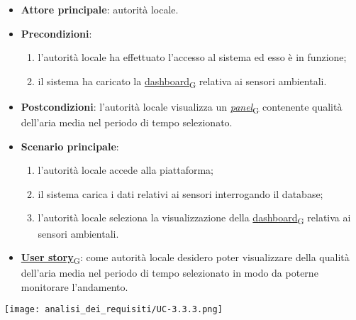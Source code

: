 \newpage
{}
\begin{itemize}
	\item \textbf{Attore principale}: autorità locale.
	\item \textbf{Precondizioni}:
	      \begin{enumerate}
		      \item l'autorità locale ha effettuato l'accesso al sistema ed esso è in funzione;
		      \item il sistema ha caricato la \href{https://7last.github.io/docs/pb/documentazione-interna/glossario\#dashboard}{dashboard\textsubscript{G}} relativa ai sensori ambientali.
	      \end{enumerate}
	\item \textbf{Postcondizioni}: l'autorità locale visualizza un \href{https://7last.github.io/docs/pb/documentazione-interna/glossario\#panel}{\textit{panel}\textsubscript{G}} contenente qualità dell'aria media nel periodo di tempo selezionato.
	\item \textbf{Scenario principale}:
	      \begin{enumerate}
		      \item l'autorità locale accede alla piattaforma;
		      \item il sistema carica i dati relativi ai sensori interrogando il database;
		      \item l'autorità locale seleziona la visualizzazione della \href{https://7last.github.io/docs/pb/documentazione-interna/glossario\#dashboard}{dashboard\textsubscript{G}} relativa ai sensori ambientali.
	      \end{enumerate}
	\item \href{https://7last.github.io/docs/pb/documentazione-interna/glossario\#user-story}{\textbf{User story}\textsubscript{G}}: come autorità locale desidero poter visualizzare della qualità dell'aria media nel periodo di tempo selezionato
	      in modo da poterne monitorare l'andamento.
\end{itemize}
\begin{center}
	\texttt{[image: analisi\_dei\_requisiti/UC-3.3.3.png]}
\end{center}


